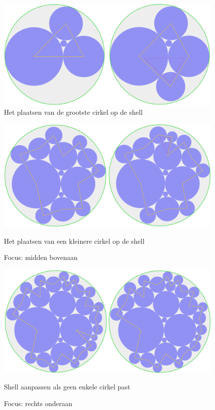 \documentclass[12pt,a4paper,oneside]{book}
\begin{document}
\begin{figure}
  \centering
  \includegraphics[width=1.0\textwidth]{plaats-op-shell-simpel.png}
  \caption{Het plaatsen van de grootste cirkel op de shell} \label{fig:plaats-op-shell-simpel} 
\end{figure}

\begin{figure}
  \centering
  \includegraphics[width=1.0\textwidth]{plaats-op-shell-kleiner.png}
  \caption{Het plaatsen van een kleinere cirkel op de shell} \label{fig:plaats-op-shell-kleiner} 
  \caption*{Focus: midden bovenaan}
\end{figure}

\begin{figure}
  \centering
  \includegraphics[width=1.0\textwidth]{plaats-op-shell-geen-enkele-past.png}
  \caption{Shell aanpassen als geen enkele cirkel past} \label{fig:plaats-op-shell-geen-enkele-past} 
  \caption*{Focus: rechts onderaan}
\end{figure}
\end{document}
